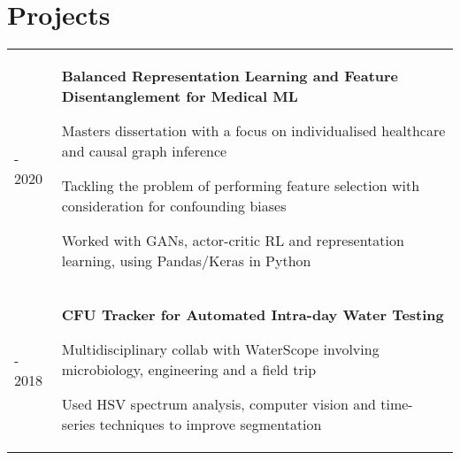 \documentclass[letterpaper, 10pt]{article}
\begin{document}
\section*{Projects}
\begin{tabularx}{\linewidth}{>{\raggedleft}p{2.2cm}|p{6.45cm} X}
2019 - 2020 & \multicolumn{2}{p{\linegoal}}{
    \vspace{-2.9mm}\textbf{Balanced Representation Learning and Feature Disentanglement for Medical ML}
    \begin{compact}
        \item Masters dissertation with a focus on individualised healthcare and causal graph inference
        \item Tackling the problem of performing feature selection with consideration for confounding biases
        \item Worked with GANs, actor-critic RL and representation learning, using Pandas/Keras in Python
        \vspace{-.5\baselineskip}
    \end{compact}
}\\
2017 - 2018 & \multicolumn{2}{p{\linegoal}}{
	\vspace{-2.9mm}\textbf{CFU Tracker for Automated Intra-day Water Testing}
	\begin{compact}
		\item Multidisciplinary collab with WaterScope involving microbiology, engineering and a field trip
		\item Used HSV spectrum analysis, computer vision and time-series techniques to improve segmentation
		\vspace{-2\baselineskip}
	\end{compact}
}\\
\end{tabularx}
\end{document}
